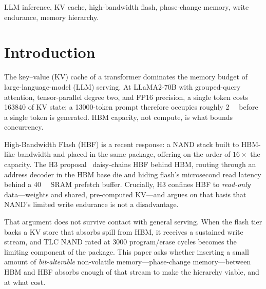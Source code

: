 \documentclass[conference]{IEEEtran}
\begin{document}
\begin{IEEEkeywords}
LLM inference, KV cache, high-bandwidth flash, phase-change memory, write
endurance, memory hierarchy.
\end{IEEEkeywords}

\section{Introduction}
The key--value (KV) cache of a transformer dominates the memory budget of
large-language-model (LLM) serving. At LLaMA2-70B with grouped-query attention,
tensor-parallel degree two, and FP16 precision, a single token costs
\SI{163840}{\byte} of KV state; a \num{13000}-token prompt therefore occupies
roughly \SI{2}{\gibi\byte} before a single token is generated. HBM capacity, not
compute, is what bounds concurrency.

High-Bandwidth Flash (HBF) is a recent response: a NAND stack built to HBM-like
bandwidth and placed in the same package, offering on the order of $16\times$
the capacity. The H3 proposal~\cite{h3} daisy-chains HBF behind HBM, routing
through an address decoder in the HBM base die and hiding flash's microsecond
read latency behind a \SI{40}{\mega\byte} SRAM prefetch buffer. Crucially, H3
confines HBF to \emph{read-only} data---weights and shared, pre-computed KV---and
argues on that basis that NAND's limited write endurance is not a disadvantage.

That argument does not survive contact with general serving. When the flash tier
backs a KV store that absorbs spill from HBM, it receives a sustained write
stream, and TLC NAND rated at \num{3000} program/erase cycles becomes the
limiting component of the package. This paper asks whether inserting a small
amount of \emph{bit-alterable} non-volatile memory---phase-change memory---between
HBM and HBF absorbs enough of that stream to make the hierarchy viable, and at
what cost.
\end{document}
